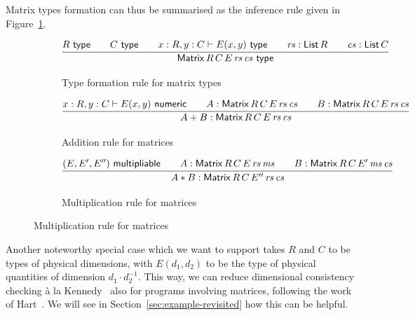 \documentclass{IMEKO2024}
\newcommand{\istype}[1]{#1\ \textsf{type}}
\newcommand{\isadd}[1]{#1\ \textsf{numeric}}
\newcommand{\ismult}[3]{(#1, #2, #3)\ \textsf{multipliable}}
\newcommand{\Matrix}[5]{\mathsf{Matrix}\,#1\,#2\,#3\,#4\,#5}
\newcommand{\List}[1]{\mathsf{List}\,#1}
\begin{document}
Matrix types formation can thus be summarised as the inference rule
given in Figure~\ref{fig:matrix_intro}.
%
\begin{figure}[th]
\begin{subfigure}{\textwidth}
  \begin{center}
    \[
      \infer{\istype{\Matrix{R}{C}{E}{\rs}{\cs}}}
      {
        \istype{R}
        &\quad
        \istype{C}
        &\quad
        x : R, y : C \vdash \istype{E(x,y)}
        &\quad
        \rs : \List{R}
        &\quad
        \cs : \List{C}
      }
    \]
  \end{center}
  \caption{Type formation rule for matrix types}
  \label{fig:matrix_intro}
\end{subfigure}
\hfill
\begin{subfigure}{\textwidth}
  \begin{center}
    \[
      \infer{A + B : \Matrix{R}{C}{E}{\rs}{\cs}}
      {
        x : R, y : C \vdash \isadd{E(x, y)}
        &\quad
        A : \Matrix{R}{C}{E}{\rs}{\cs}
        &\quad
        B : \Matrix{R}{C}{E}{\rs}{\cs}
      }
    \]
  \end{center}
  \caption{Addition rule for matrices}
  \label{fig:matrix_add}
\end{subfigure}
\hfill
\begin{subfigure}{\textwidth}
  \begin{center}
    \[
      \infer{A * B : \Matrix{R}{C}{E''}{\rs}{\cs}}
      {
        \ismult{E}{E'}{E''}
        &\quad
        A : \Matrix{R}{C}{E}{\rs}{\ms}
        &\quad
        B : \Matrix{R}{C}{E'}{\ms}{\cs}
      }
    \]
  \end{center}
  \caption{Multiplication rule for matrices}
  \label{fig:matrix_mul}
\end{subfigure}
\label{fig:matrix_rules}
\end{figure}

Another noteworthy special case which we want to support takes $R$ and
$C$ to be types of physical dimensions, with $E(d_1, d_2)$ to be the
type of physical quantities of dimension $d_1 \cdot d_2^{-1}$.
%
This way, we can reduce dimensional consistency checking \`a la
Kennedy~\cite{kennedyUOM} also for programs involving matrices,
following the work of Hart~\cite{hart}.
%
We will see in Section~\ref{sec:example-revisited} how this can be helpful.
\end{document}
